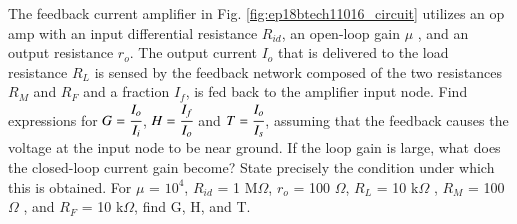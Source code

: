 
The feedback current amplifier in Fig. \ref{fig:ep18btech11016_circuit} utilizes an op amp with an input differential resistance $R_{id}$, an open-loop gain $\mu$ , and an output resistance $r_o$. The output current $I_o$ that is delivered to the load resistance $R_L$ is sensed by the feedback network composed of the two resistances $R_M$ and $R_F$ and a fraction $I_f$, is fed back to the amplifier input node. Find expressions for $G = \cfrac{I_o}{I_i}$, $H = \cfrac{I_f}{I_o}$ and $T = \cfrac{I_o}{I_s}$, assuming that the feedback causes the voltage at the input node to be near ground. If the loop gain is large, what does the closed-loop current gain become? State precisely the condition under which this is obtained. For $\mu$ = $10^4$, $R_{id}$ = 1 M$\Omega$, $r_o$ = 100 $\Omega$, $R_L$ = 10 k$\Omega$ , $R_M$ = 100 $\Omega$ , and $R_F$ = 10 k$\Omega$, find G, H, and T.


